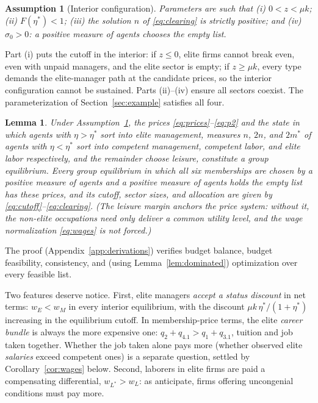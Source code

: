 \documentclass[12pt,letterpaper]{article}
\newtheorem{lemma}{Lemma}
\newtheorem{assumption}{Assumption}
\theoremstyle{definition}
\begin{document}
\begin{assumption}[Interior configuration]\label{ass:interior} Parameters are such that (i) $0 < z < \mu k$; (ii) $F(\eta^\ast)<1$; (iii) the solution $n$ of \eqref{eq:clearing} is strictly positive; and (iv) $\sigma_0> 0$: a positive measure of agents chooses the empty list.
\end{assumption}

Part (i) puts the cutoff in the interior: if $z\leq 0$, elite firms cannot break even, even with unpaid managers, and the elite sector is empty; if $z\geq\mu k$, every type demands the elite-manager path at the candidate prices, so the interior configuration cannot be sustained.
Parts (ii)--(iv) ensure all sectors coexist.
The parameterization of Section~\ref{sec:example} satisfies all four.

\begin{lemma}\label{lem:characterization} Under Assumption~\ref{ass:interior}, the prices \eqref{eq:prices}--\eqref{eq:p2} and the state in which agents with $\eta>\eta^\ast$ sort into elite management, measures $n$, $2n$, and $2m^\ast$ of agents with $\eta<\eta^\ast$ sort into competent management, competent labor, and elite labor respectively, and the remainder choose leisure, constitute a group equilibrium.
Every group equilibrium in which all six memberships are chosen by a positive measure of agents \emph{and} a positive measure of agents holds the empty list has these prices, and its cutoff, sector sizes, and allocation are given by \eqref{eq:cutoff}--\eqref{eq:clearing}.
(The leisure margin anchors the price system: without it, the non-elite occupations need only deliver a common utility level, and the wage normalization \eqref{eq:wages} is not forced.)
\end{lemma}

The proof (Appendix~\ref{app:derivations}) verifies budget balance, budget feasibility, consistency, and (using Lemma~\ref{lem:dominated}) optimization over every feasible list.

Two features deserve notice.
First, elite managers \emph{accept a status discount} in net terms: $w_E<w_M$ in every interior equilibrium, with the discount $\mu k\,\eta^\ast/(1+\eta^\ast)$ increasing in the equilibrium cutoff.
In membership-price terms, the elite \emph{career bundle} is always the more expensive one: $q_2+q_{4.1} > q_1+q_{3.1}$, tuition and job taken together.
Whether the job taken alone pays more (whether observed elite \emph{salaries} exceed competent ones) is a separate question, settled by Corollary~\ref{cor:wages} below.
Second, laborers in elite firms are paid a compensating differential, $w_{L^\ast}>w_L$: as \citet[p.~151]{ellickson2006organization} anticipate, firms offering uncongenial conditions must pay more.
\end{document}
